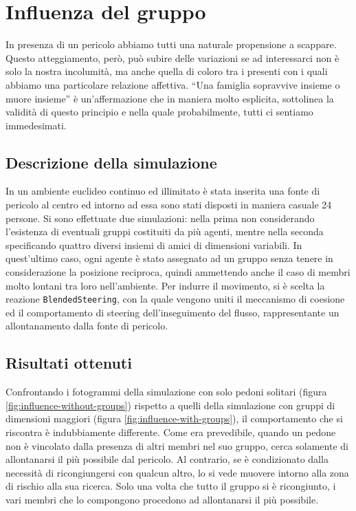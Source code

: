 \section{Influenza del gruppo}
In presenza di un pericolo abbiamo tutti una naturale propensione a scappare. Questo atteggiamento, però, può subire delle variazioni se ad interessarci non è solo la nostra incolumità, ma anche quella di coloro tra i presenti con i quali abbiamo una particolare relazione affettiva. \newline
\enquote{Una famiglia sopravvive insieme o muore insieme} \cite{Kster2011} è un'affermazione che in maniera molto esplicita, sottolinea la validità di questo principio e nella quale probabilmente, tutti ci sentiamo immedesimati.

\subsection{Descrizione della simulazione}
In un ambiente euclideo continuo ed illimitato è stata inserita una fonte di pericolo al centro ed intorno ad essa sono stati disposti in maniera casuale 24 persone. \newline
Si sono effettuate due simulazioni: nella prima non considerando l'esistenza di eventuali gruppi costituiti da più agenti, mentre nella seconda specificando quattro diversi insiemi di amici di dimensioni variabili. In quest'ultimo caso, ogni agente è stato assegnato ad un gruppo senza tenere in considerazione la posizione reciproca, quindi ammettendo anche il caso di membri molto lontani tra loro nell'ambiente. \newline
Per indurre il movimento, si è scelta la reazione \texttt{BlendedSteering}, con la quale vengono uniti il meccanismo di coesione ed il comportamento di steering dell'inseguimento del flusso, rappresentante un allontanamento dalla fonte di pericolo.

\subsection{Risultati ottenuti}
Confrontando i fotogrammi della simulazione con solo pedoni solitari (figura \ref{fig:influence-without-groups}) rispetto a quelli della simulazione con gruppi di dimensioni maggiori (figura \ref{fig:influence-with-groups}), il comportamento che si riscontra è indubbiamente differente. \newline
Come era prevedibile, quando un pedone non è vincolato dalla presenza di altri membri nel suo gruppo, cerca solamente di allontanarsi il più possibile dal pericolo. \newline 
Al contrario, se è condizionato dalla necessità di ricongiungersi con qualcun altro, lo si vede muovere intorno alla zona di rischio alla sua ricerca. Solo una volta che tutto il gruppo si è ricongiunto, i vari membri che lo compongono procedono ad allontanarsi il più possibile.

